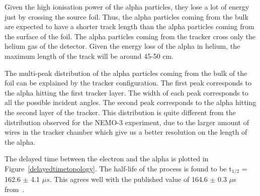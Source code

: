 \documentclass[main.tex]{subfiles}
\begin{document}
\FloatBarrier


\noindent Given the high ionisation power of the alpha particles, they lose a lot of energy just by crossing the source foil. Thus, the alpha particles coming from the bulk are expected to have a shorter track length than the alpha particles coming from the surface of the foil. The alpha particles coming from the tracker cross only the helium gas of the detector. Given the energy loss of the alpha in helium, the maximum length of the track will be around 45-50 cm.

\bigskip

\noindent The multi-peak distribution of the alpha particles coming from the bulk of the foil can be explained by the tracker configuration. The first peak corresponds to the alpha hitting the first tracker layer. The width of each peak corresponds to all the possible incident angles. The second peak corresponds to the alpha hitting the second layer of the tracker. This distribution is quite different from the distribution observed for the NEMO-3 experiment, due to the larger amount of wires in the tracker chamber which give us a better resolution on the length of the alpha. 



\bigskip


\noindent The delayed time between the electron and the alpha is plotted in Figure~\ref{delayedtimetopology}. The half-life of the process is found to be t$_{\text{1/2}}$ = 162.6 $\pm$ 4.1 $\mu s$. This agrees well with the published value of 164.6 $\pm$ 0.3 $\mu$s from~\cite{NuclearDataSheet210}.
\end{document}
